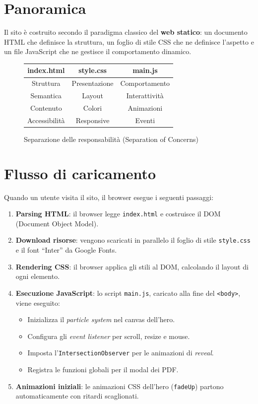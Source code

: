 \documentclass[a4paper,12pt]{report}
\begin{document}
\section{Panoramica}

Il sito \`e costruito secondo il paradigma classico del \textbf{web statico}: un documento HTML che definisce la struttura, un foglio di stile CSS che ne definisce l'aspetto e un file JavaScript che ne gestisce il comportamento dinamico.

\begin{figure}[H]
\centering
\begin{tabular}{|c|c|c|}
\hline
\textbf{index.html} & \textbf{style.css} & \textbf{main.js} \\
\hline
Struttura & Presentazione & Comportamento \\
\hline
Semantica & Layout & Interattivit\`a \\
\hline
Contenuto & Colori & Animazioni \\
\hline
Accessibilit\`a & Responsive & Eventi \\
\hline
\end{tabular}
\caption{Separazione delle responsabilit\`a (Separation of Concerns)}
\end{figure}

\section{Flusso di caricamento}

Quando un utente visita il sito, il browser esegue i seguenti passaggi:

\begin{enumerate}[leftmargin=2cm]
    \item \textbf{Parsing HTML}: il browser legge \texttt{index.html} e costruisce il DOM (Document Object Model).
    \item \textbf{Download risorse}: vengono scaricati in parallelo il foglio di stile \texttt{style.css} e il font ``Inter'' da Google Fonts.
    \item \textbf{Rendering CSS}: il browser applica gli stili al DOM, calcolando il layout di ogni elemento.
    \item \textbf{Esecuzione JavaScript}: lo script \texttt{main.js}, caricato alla fine del \texttt{<body>}, viene eseguito:
    \begin{itemize}
        \item Inizializza il \textit{particle system} nel canvas dell'hero.
        \item Configura gli \textit{event listener} per scroll, resize e mouse.
        \item Imposta l'\texttt{IntersectionObserver} per le animazioni di \textit{reveal}.
        \item Registra le funzioni globali per il modal dei PDF.
    \end{itemize}
    \item \textbf{Animazioni iniziali}: le animazioni CSS dell'hero (\texttt{fadeUp}) partono automaticamente con ritardi scaglionati.
\end{enumerate}
\end{document}
